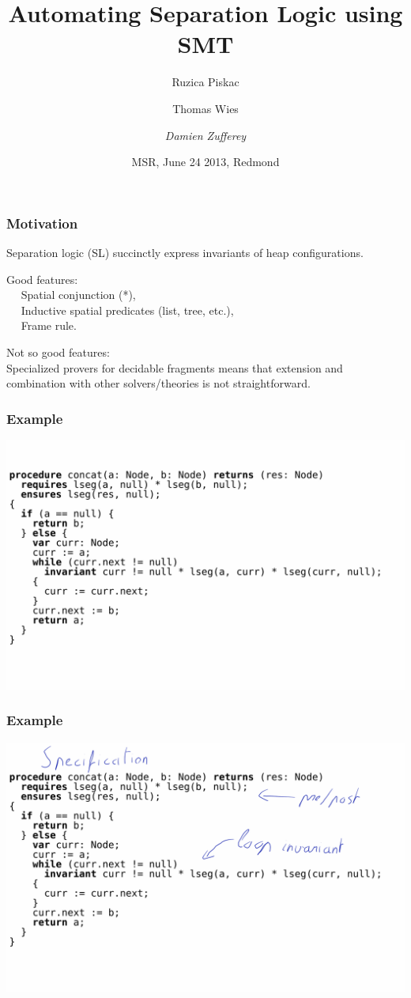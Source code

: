 \documentclass{beamer}
\title[Automating Separation Logic using SMT]{Automating Separation Logic using SMT}
\author[Damien Zufferey]{
  Ruzica Piskac \and
  Thomas Wies \and
  \emph{Damien Zufferey}
}
\institute{ MPI-SWS \hspace{10mm} NYU \hspace{10mm} IST Austria }
\date{MSR, June 24 2013, Redmond}
\begin{document}
\frame[plain]{\titlepage}

\begin{frame}
  \frametitle{Motivation}
  Separation logic (SL) succinctly express invariants of heap configurations.

  \vspace{1ex}

  Good features:\\
  \mbox{} ~~ Spatial conjunction (*),\\
  \mbox{} ~~ Inductive spatial predicates (list, tree, etc.),\\
  \mbox{} ~~ Frame rule.

  \vspace{1ex}

  Not so good features:\\
  Specialized provers for decidable fragments means that extension and combination with other solvers/theories is not straightforward.

\end{frame}

\begin{frame}
  \frametitle{Example}
  \includegraphics[scale=0.17]{resources/merge1.png}
\end{frame}

\begin{frame}
  \frametitle{Example}
  \includegraphics[scale=0.23]{resources/spec.png}
\end{frame}
\end{document}
